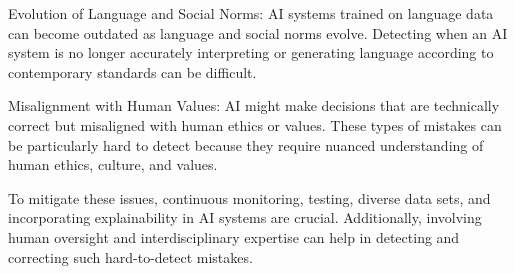 \begin{aibox}
Evolution of Language and Social Norms: AI systems trained on language data can become outdated as language and social norms evolve. Detecting when an AI system is no longer accurately interpreting or generating language according to contemporary standards can be difficult.

Misalignment with Human Values: AI might make decisions that are technically correct but misaligned with human ethics or values. These types of mistakes can be particularly hard to detect because they require nuanced understanding of human ethics, culture, and values.

To mitigate these issues, continuous monitoring, testing, diverse data sets, and incorporating explainability in AI systems are crucial. Additionally, involving human oversight and interdisciplinary expertise can help in detecting and correcting such hard-to-detect mistakes.
\end{aibox}
